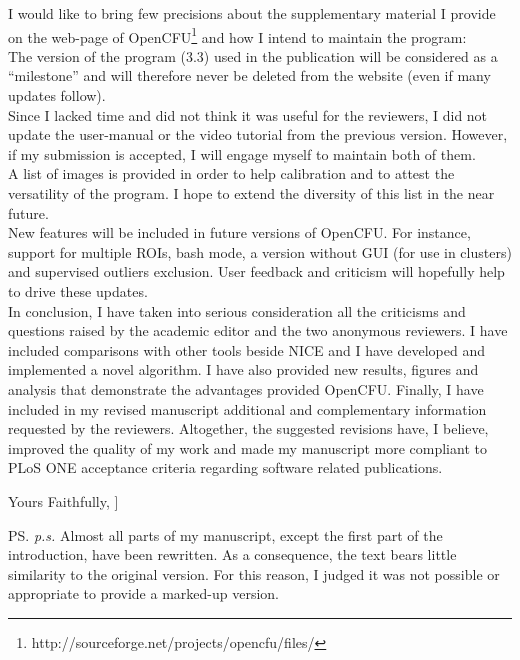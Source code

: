 \documentclass{letter}
\begin{document}
\begin{letter}{}
I would like to bring few precisions about the supplementary material I provide on the web-page of OpenCFU\footnote{http://sourceforge.net/projects/opencfu/files/}
and how I intend to maintain the program:\\
The version of the program (3.3) used in the publication will be considered as a ``milestone'' and will therefore never be deleted from the website (even if many updates follow).\\
Since I lacked time and did not think it was useful for the reviewers, I did not update the user-manual or the video tutorial from the previous version.
However, if my submission is accepted, I will engage myself to maintain both of them.\\
A list of images is provided in order to help calibration and to attest the versatility of the program. 
I hope to extend the diversity of this list in the near future.\\
New features will be included in future versions of OpenCFU.
For instance, support for multiple ROIs, bash mode, a version without GUI (for use in clusters) and supervised outliers exclusion.
User feedback and criticism will hopefully help to drive these updates.\\

In conclusion, I have taken into serious consideration all the criticisms
and questions raised by the academic editor and the two anonymous reviewers.
I have included comparisons with other tools beside NICE and I have developed and
implemented a novel algorithm. I have also provided new results, figures and analysis
that demonstrate the advantages provided OpenCFU.  Finally, I have included in my revised
manuscript additional and complementary information requested by the
reviewers.
Altogether, the suggested revisions have, I believe, improved the quality of my
work and made my manuscript more compliant to PLoS ONE acceptance criteria regarding software related publications.



\closing{Yours Faithfully,
     ]}
\ps{\emph{p.s.} Almost all parts of my manuscript, except the first part of the introduction, have been rewritten. 
As a consequence, the text bears little similarity to the original version.
 For this reason, I judged it was not possible or appropriate to provide a marked-up version.}

\end{letter}

\end{document}
